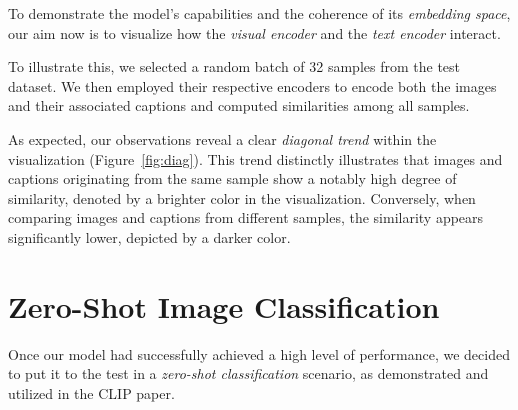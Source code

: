 \documentclass[10pt,twocolumn,letterpaper]{article}
\begin{document}
To demonstrate the model's capabilities and the coherence of its \textit{embedding space}, our aim now is to visualize how the \textit{visual encoder} and the \textit{text encoder} interact. %

To illustrate this, we selected a random batch of 32 samples from the test dataset.
We then employed their respective encoders to encode both the images and their associated captions and computed similarities among all samples.


As expected, our observations reveal a clear \textit{diagonal trend} within the visualization (Figure\ \ref{fig:diag}).
This trend distinctly illustrates that images and captions originating from the same sample show a notably high degree of similarity, denoted by a brighter color in the visualization.
Conversely, when comparing images and captions from different samples, the similarity appears significantly lower, depicted by a darker color.


\section{Zero-Shot Image Classification}

Once our model had successfully achieved a high level of performance, we decided to put it to the test in a \textit{zero-shot classification} scenario, as demonstrated and utilized in the CLIP paper.
\end{document}
